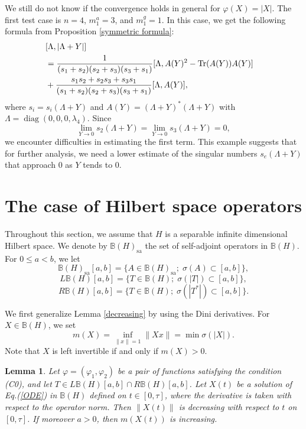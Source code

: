 \documentclass[12pt]{article}
\newtheorem{lemma}[theorem]{Lemma}
\theoremstyle{definition}
\numberwithin{equation}{section}
\newcommand{\B}{\mathbb{B}}
\DeclareMathOperator{\diag}{diag}
\DeclareMathOperator{\Tr}{Tr}
\begin{document}
We still do not know if the convergence holds in general for $\varphi(X)=|X|$.   
The first test case is $n=4$, $m^a_1=3$, and $m^g_1=1$. 
In this case, we get the following formula from Proposition \ref{symmetric formula}:
\begin{align*}
\lefteqn{[\Lambda,|\Lambda+Y|]} \\
 &=\frac{1}{(s_1+s_2)(s_2+s_3)(s_3+s_1)}[\Lambda,A(Y)^2-\Tr(A(Y))A(Y)]\\
 &+\frac{s_1s_2+s_2s_3+s_3s_1}{(s_1+s_2)(s_2+s_3)(s_3+s_1)}[\Lambda,A(Y)],
\end{align*}
where $s_i=s_i(\Lambda+Y)$ and $A(Y)=(\Lambda+Y)^*(\Lambda+Y)$ with $\Lambda=\diag(0,0,0,\lambda_4)$. 
Since 
\[\lim_{Y\to 0}s_2(\Lambda+Y)=\lim_{Y\to 0}s_3(\Lambda+Y)=0,\]
we encounter difficulties in estimating the first term. 
This example suggests that for further analysis, we need a lower estimate of the singular numbers 
$s_e(\Lambda+Y)$ that approach 0 as $Y$ tends to 0.  












\section{The case of Hilbert space operators}
Throughout this section, we assume that $H$ is a separable infinite dimensional Hilbert space. 
We denote by $\B(H)_{\mathrm{sa}}$ the set of self-adjoint operators in $\B(H)$. 
For $0\leq a<b$, we let 
\[\B(H)_{\mathrm{sa}}[a,b]=\{A\in \B(H)_{\mathrm{sa}};\; \sigma(A)\subset [a,b]\},\]
\[L\B(H)[a,b]=\{T\in \B(H);\; \sigma(|T|)\subset [a,b]\},\]
\[R\B(H)[a,b]=\{T\in \B(H);\; \sigma(|T^*|)\subset [a,b]\}.\]

We first generalize Lemma \ref{decreasing} by using the Dini derivatives. 
For $X\in \B(H)$, we set 
\[m(X)=\inf_{\|x\|=1}\|Xx\|=\min\sigma(|X|).\]
Note that $X$ is left invertible if and only if $m(X)>0$.  
 
\begin{lemma}\label{decreasing2} Let $\varphi=(\varphi_1,\varphi_2)$ be a pair of functions satisfying the condition (C0), and 
let $T\in L\B(H)[a,b]\cap R\B(H)[a,b]$. 
Let $X(t)$ be a solution of Eq.(\ref{ODE}) in $\B(H)$ defined on $t\in [0,\tau]$, where the derivative 
is taken with respect to the operator norm. 
Then $\|X(t)\|$ is decreasing with respect to $t$ on $[0,\tau]$. 
If moreover  $a>0$, then $m(X(t))$ is increasing.     
\end{lemma}
\end{document}
